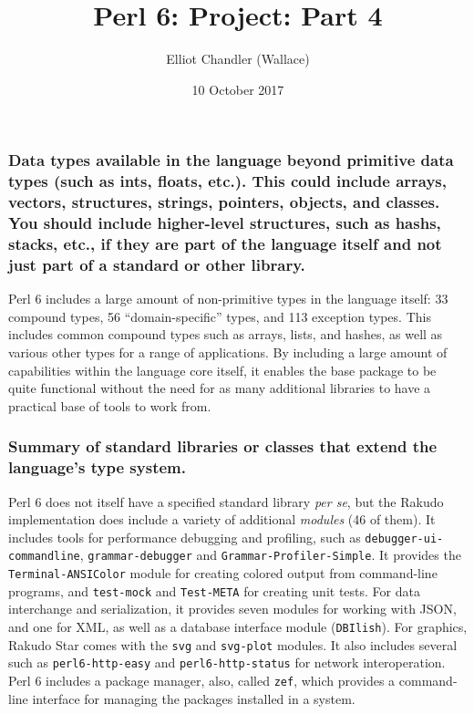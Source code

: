 \documentclass[17pt,english]{extarticle}
\begin{document}
\title{Perl 6: Project: Part 4}


\author{Elliot Chandler (Wallace)}


\date{10 October 2017}

\maketitle

\subsubsection*{Data types available in the language beyond primitive data types
(such as ints, floats, etc.). This could include arrays, vectors,
structures, strings, pointers, objects, and classes. You should include
higher-level structures, such as hashs, stacks, etc., if they are
part of the language itself and not just part of a standard or other
library.}

Perl 6 includes a large amount of non-primitive types in the language
itself: 33 compound types, 56 ``domain-specific'' types, and 113
exception types. This includes common compound types such as arrays,
lists, and hashes, as well as various other types for a range of applications.
By including a large amount of capabilities within the language core
itself, it enables the base package to be quite functional without
the need for as many additional libraries to have a practical base
of tools to work from.


\subsubsection*{Summary of standard libraries or classes that extend the language’s
type system.}

Perl 6 does not itself have a specified standard library \emph{per
se}, but the Rakudo implementation does include a variety of additional
\emph{modules} (46 of them).\citep{New1} It includes tools for performance
debugging and profiling, such as \texttt{debugger-ui-commandline},
\texttt{grammar-debugger} and \texttt{Grammar-Profiler-Simple}. It
provides the \texttt{Terminal-ANSIColor} module for creating colored
output from command-line programs, and \texttt{test-mock} and \texttt{Test-META}
for creating unit tests. For data interchange and serialization, it
provides seven modules for working with JSON, and one for XML, as
well as a database interface module (\texttt{DBIlish}). For graphics,
Rakudo Star comes with the \texttt{svg} and \texttt{svg-plot} modules.
It also includes several such as \texttt{perl6-http-easy} and \texttt{perl6-http-status}
for network interoperation. Perl 6 includes a package manager, also,
called \texttt{zef}, which provides a command-line interface for managing
the packages installed in a system.
\end{document}
